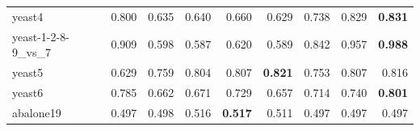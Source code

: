 {\begin{table}[hbp]
{\begin{tabular}{lrrrrrrrr}
	yeast4 & 0.800 & 0.635 & 0.640 & 0.660 & 0.629 & 0.738 & 0.829 & \textbf{0.831} \\
	yeast-1-2-8-9\_vs\_7 & 0.909 & 0.598 & 0.587 & 0.620 & 0.589 & 0.842 & 0.957 & \textbf{0.988} \\
	yeast5 & 0.629 & 0.759 & 0.804 & 0.807 & \textbf{0.821} & 0.753 & 0.807 & 0.816 \\
	yeast6 & 0.785 & 0.662 & 0.671 & 0.729 & 0.657 & 0.714 & 0.740 & \textbf{0.801} \\
	abalone19 & 0.497 & 0.498 & 0.516 & \textbf{0.517} & 0.511 & 0.497 & 0.497 & 0.497 \\
	\bottomrule
\end{tabular}%
		
	}
	\label{tab:Precision}%
\end{table}%


}
